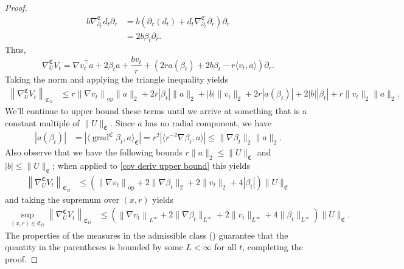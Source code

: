 \documentclass[11pt]{article}
\begin{document}
\begin{proof}
\begin{align*}
        b\nabla_{\partial_r}^{\mathfrak{C}}d_t\partial_r &= b\left(\partial_r(d_t) + d_t\nabla^\mathfrak{C}_{\partial_r}\partial_r\right)\partial_r \\
        &= 2b \beta_t\partial_r.
    \end{align*}
    Thus,
    \[\nabla^{\mathfrak{C}}_{U}V_t = \nabla v_t^\top a + 2 \beta_t a+ \frac{bv_t}{r} + \left(2ra(\beta_t) + 2b\beta_t - r\langle v_t, a\rangle\right)\partial_r.\]
    Taking the norm and applying the triangle inequality yields
    \begin{align}
        \left\| \nabla^\mathfrak{C}_U V_t\right\|_{\mathfrak{C}_\Omega} &\le  r\left\|\nabla v_t \right\|_{\operatorname{op}}\|a\|_2 + 2r|\beta_t|\|a\|_2 + |b|\|v_t\|_2 + 2r|a(\beta_t)| + 2|b||\beta_t| + r\|v_t\|_2\|a\|_2. \label{cov deriv upper bound}
    \end{align}
    We'll continue to upper bound these terms until we arrive at something that is a constant multiple of $\|U\|_\mathfrak{C}$. Since $a$ has no radial component, we have
    \begin{align*}
        |a(\beta_t)| &= |\langle \operatorname{grad}^\mathfrak{C}\beta_t, a \rangle_{\mathfrak{C}}| = r^2|\langle r^{-2}\nabla \beta_t, a\rangle | \leq \|\nabla \beta_t\|_2\|a\|_2.
    \end{align*}
    Also observe that we have the following bounds $r\|a\|_2 \leq \|U\|_{\mathfrak{C}}$ and $|b| \leq \|U\|_{\mathfrak{C}}$; when applied to \cref{cov deriv upper bound} this yields
    \begin{align*}
        \left\| \nabla^\mathfrak{C}_U V_t\right\|_{\mathfrak{C}_\Omega} &\le  \left(\left\|\nabla v_t \right\|_{\operatorname{op}} + 2\|\nabla \beta_t\|_2 + 2\|v_t\|_2  + 4|\beta_t|\right)\|U\|_{\mathfrak{C}}
    \end{align*}
    and taking the supremum over $(x,r)$ yields
    \begin{align*}
        \sup_{(x,r)\in \mathfrak{C}_\Omega}\left\| \nabla^\mathfrak{C}_U V_t\right\|_{\mathfrak{C}_\Omega} &\le  \left(\left\|\nabla v_t \right\|_{L^\infty} + 2\|\nabla \beta_t\|_{L^\infty} + 2\|v_t\|_{L^\infty}  + 4\|\beta_t\|_{L^\infty}\right)\|U\|_{\mathfrak{C}}.
    \end{align*}
    The properties of the measures in the admissible class () guarantee that the quantity in the parentheses is bounded by some $L < \infty$ for all $t$, completing the proof.
\end{proof}
\end{document}

